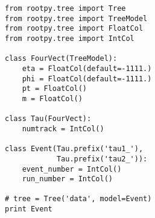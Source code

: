 \begin{footnotesize}
\begin{verbatim}
from rootpy.tree import Tree
from rootpy.tree import TreeModel
from rootpy.tree import FloatCol
from rootpy.tree import IntCol

class FourVect(TreeModel):
    eta = FloatCol(default=-1111.)
    phi = FloatCol(default=-1111.)
    pt = FloatCol()
    m = FloatCol()

class Tau(FourVect):
    numtrack = IntCol()

class Event(Tau.prefix('tau1_'),
            Tau.prefix('tau2_')):
    event_number = IntCol()
    run_number = IntCol()

# tree = Tree('data', model=Event)
print Event
\end{verbatim}
\end{footnotesize}
